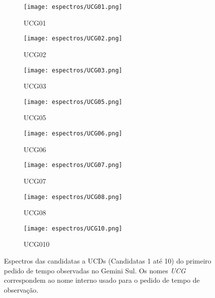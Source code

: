 \begin{figure}[H]
    \centering
    \captionsetup{justification=centering}
    \begin{subfigure}[b]{0.45\textwidth}
        \texttt{[image: espectros/UCG01.png]}
        \caption{UCG01}
    \end{subfigure}
    \begin{subfigure}[b]{0.45\textwidth}
        \texttt{[image: espectros/UCG02.png]}
        \caption{UCG02}
    \end{subfigure}
    \begin{subfigure}[b]{0.45\textwidth}
        \texttt{[image: espectros/UCG03.png]}
        \caption{UCG03}
    \end{subfigure}
    \begin{subfigure}[b]{0.45\textwidth}
        \texttt{[image: espectros/UCG05.png]}
        \caption{UCG05}
    \end{subfigure}
    \begin{subfigure}[b]{0.45\textwidth}
        \texttt{[image: espectros/UCG06.png]}
        \caption{UCG06}
    \end{subfigure}
    \begin{subfigure}[b]{0.45\textwidth}
        \texttt{[image: espectros/UCG07.png]}
        \caption{UCG07}
    \end{subfigure}
    \begin{subfigure}[b]{0.45\textwidth}
        \texttt{[image: espectros/UCG08.png]}
        \caption{UCG08}
    \end{subfigure}
    \begin{subfigure}[b]{0.45\textwidth}
        \texttt{[image: espectros/UCG10.png]}
        \caption{UCG010}
    \end{subfigure}
    \caption{Espectros das candidatas a UCDs (Candidatas 1 até 10) do primeiro pedido de tempo observadas no Gemini Sul. Os nomes \textit{UCG} correspondem ao nome interno usado para o pedido de tempo de observação.}
    \label{espectros_candidatas_1_p1}
\end{figure}


